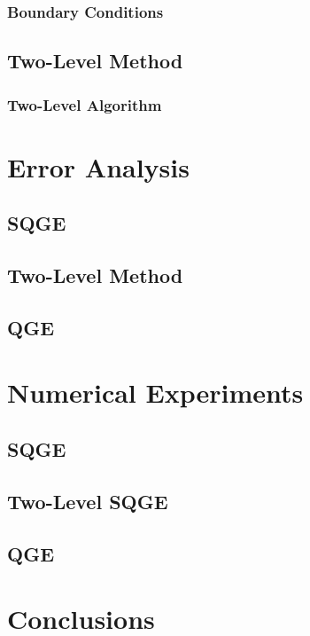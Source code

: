 \documentclass[12pt,doublespace]{VTthesis}
\begin{document}
      \subsection{Boundary Conditions} \label{sse:BCs}
      
    \section{Two-Level Method} \label{sec:TwoLevel}
    
      \subsection{Two-Level Algorithm} \label{sse:Algorithm}
      

  \chapter{Error Analysis} \label{ch:Errors}
  
    \section{SQGE} \label{sec:SQGEErrors}
    
    \section{Two-Level Method} \label{sse:SQGE2LE}
    
    \section{QGE} \label{sec:QGEError}
    

  \chapter{Numerical Experiments} \label{ch:Tests}
  
    \section{SQGE} \label{sec:SQGETests}
    
    \section{Two-Level SQGE} \label{sec:SQGE2LTests}
    
    \section{QGE} \label{sec:QGETests}
    

  \chapter{Conclusions} \label{ch:Conclusions}
  

  
  

%  
\end{document}
